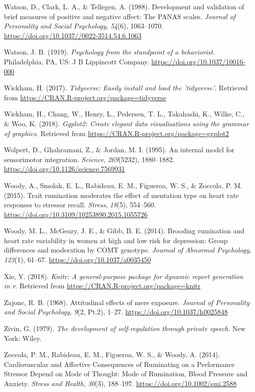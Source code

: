 \documentclass[a4paper,12pt,twoside,openright,oldfontcommands]{memoir}
\begin{document}
\leavevmode\hypertarget{ref-watson_development_1988}{}%
Watson, D., Clark, L. A., \& Tellegen, A. (1988). Development and validation of brief measures of positive and negative affect: The PANAS scales. \emph{Journal of Personality and Social Psychology}, \emph{54}(6), 1063--1070. \url{https://doi.org/10.1037//0022-3514.54.6.1063}

\leavevmode\hypertarget{ref-watson_psychology_1919}{}%
Watson, J. B. (1919). \emph{Psychology from the standpoint of a behaviorist}. Philadelphia, PA, US: J B Lippincott Company. \url{https://doi.org/10.1037/10016-000}

\leavevmode\hypertarget{ref-R-tidyverse}{}%
Wickham, H. (2017). \emph{Tidyverse: Easily install and load the 'tidyverse'}. Retrieved from \url{https://CRAN.R-project.org/package=tidyverse}

\leavevmode\hypertarget{ref-R-ggplot2}{}%
Wickham, H., Chang, W., Henry, L., Pedersen, T. L., Takahashi, K., Wilke, C., \& Woo, K. (2018). \emph{Ggplot2: Create elegant data visualisations using the grammar of graphics}. Retrieved from \url{https://CRAN.R-project.org/package=ggplot2}

\leavevmode\hypertarget{ref-wolpert_internal_1995}{}%
Wolpert, D., Ghahramani, Z., \& Jordan, M. I. (1995). An internal model for sensorimotor integration. \emph{Science}, \emph{269}(5232), 1880--1882. \url{https://doi.org/10.1126/science.7569931}

\leavevmode\hypertarget{ref-woody_trait_2015}{}%
Woody, A., Smolak, E. L., Rabideau, E. M., Figueroa, W. S., \& Zoccola, P. M. (2015). Trait rumination moderates the effect of mentation type on heart rate responses to stressor recall. \emph{Stress}, \emph{18}(5), 554--560. \url{https://doi.org/10.3109/10253890.2015.1055726}

\leavevmode\hypertarget{ref-woody_brooding_2014}{}%
Woody, M. L., McGeary, J. E., \& Gibb, B. E. (2014). Brooding rumination and heart rate variability in women at high and low risk for depression: Group differences and moderation by COMT genotype. \emph{Journal of Abnormal Psychology}, \emph{123}(1), 61--67. \url{https://doi.org/10.1037/a0035450}

\leavevmode\hypertarget{ref-R-knitr}{}%
Xie, Y. (2018). \emph{Knitr: A general-purpose package for dynamic report generation in r}. Retrieved from \url{https://CRAN.R-project.org/package=knitr}

\leavevmode\hypertarget{ref-zajonc_attitudinal_1968}{}%
Zajonc, R. B. (1968). Attitudinal effects of mere exposure. \emph{Journal of Personality and Social Psychology}, \emph{9}(2, Pt.2), 1--27. \url{https://doi.org/10.1037/h0025848}

\leavevmode\hypertarget{ref-zivin_development_1979}{}%
Zivin, G. (1979). \emph{The development of self-regulation through private speech}. New York: Wiley.

\leavevmode\hypertarget{ref-zoccola_cardiovascular_2014}{}%
Zoccola, P. M., Rabideau, E. M., Figueroa, W. S., \& Woody, A. (2014). Cardiovascular and Affective Consequences of Ruminating on a Performance Stressor Depend on Mode of Thought: Mode of Rumination, Blood Pressure and Anxiety. \emph{Stress and Health}, \emph{30}(3), 188--197. \url{https://doi.org/10.1002/smi.2588}
\end{document}
